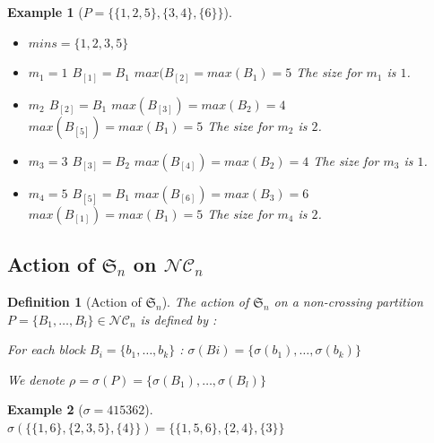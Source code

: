 \documentclass[12pt]{report}
\newtheorem{definition}{Definition}
\newtheorem*{example}{Example}
\begin{document}
\begin{example}[$P = \{\{1, 2, 5\}, \{3, 4\}, \{6\}\}$]
    \text{}
    \begin{itemize}
        \item $mins = \{1, 2, 3, 5\}$
        \item $m_1 = 1$
            \subitem $B_{[1]} = B_1$
            \subitem $max (B_{[2]} = max (B_1) = 5$
            \subitem The size for $m_1$ is $1$.
        \item $m_2$
            \subitem $B_{[2]} = B_1$
            \subitem $max (B_{[3]}) = max (B_2) = 4$
            \subitem $max (B_{[5]}) = max (B_1) = 5$
            \subitem The size for $m_2$ is $2$.
        \item $m_3 = 3$
            \subitem $B_{[3]} = B_2$
            \subitem $max (B_{[4]}) = max (B_2) = 4$
            \subitem The size for $m_3$ is $1$.
        \item $m_4 = 5$
            \subitem $B_{[5]} = B_1$
            \subitem $max (B_{[6]}) = max (B_3) = 6$
            \subitem $max (B_{[1]}) = max (B_1) = 5$
            \subitem The size for $m_4$ is $2$.
    \end{itemize}
\end{example}

\subsection{Action of $\mathfrak{S}_n$ on $\mathcal{NC}_n$}

\begin{definition}[Action of $\mathfrak{S}_n$]
    The action of $\mathfrak{S}_n$ on a non-crossing partition
    $P = \{B_1, \ldots, B_l\} \in \mathcal{NC}_n$ is defined by :\\
    \begin{itemize*}
        \item For each block $B_i = \{b_1, \ldots, b_k\}$ :
        $\sigma(Bi) =\{\sigma (b_1), \ldots, \sigma (b_k)\}$ \\
        \item We denote $\rho = \sigma(P) =
            \{\sigma (B_1), \ldots, \sigma (B_l)\}$
    \end{itemize*}
\end{definition}

\begin{example}[$\sigma = 415362$]
    \text{}\\
    $\sigma (\{\{1, 6\}, \{2, 3, 5\}, \{4\}\}) = 
        \{\{1, 5, 6\}, \{2, 4\}, \{3\}\}$
\end{example}
\end{document}
